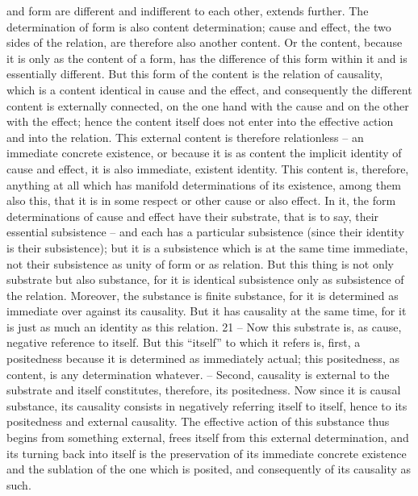 and form are different and indifferent to each other, extends further. The
determination of form is also content determination; cause and effect, the
two sides of the relation, are therefore also another content. Or the content,
because it is only as the content of a form, has the difference of this form
within it and is essentially different. But this form of the content is the
relation of causality, which is a content identical in cause and the effect,
and consequently the different content is externally connected, on the one
hand with the cause and on the other with the effect; hence the content itself
does not enter into the effective action and into the relation.
This external content is therefore relationless – an immediate concrete
existence, or because it is as content the implicit identity of cause and effect,
it is also immediate, existent identity. This content is, therefore, anything
at all which has manifold determinations of its existence, among them also
this, that it is in some respect or other cause or also effect. In it, the form
determinations of cause and effect have their substrate, that is to say, their
essential subsistence – and each has a particular subsistence (since their
identity is their subsistence); but it is a subsistence which is at the same
time immediate, not their subsistence as unity of form or as relation.
But this thing is not only substrate but also substance, for it is identical
subsistence only as subsistence of the relation. Moreover, the substance is
finite substance, for it is determined as immediate over against its causality.
But it has causality at the same time, for it is just as much an identity as this
relation. 21 – Now this substrate is, as cause, negative reference to itself. But
this “itself” to which it refers is, first, a positedness because it is determined
as immediately actual; this positedness, as content, is any determination
whatever. – Second, causality is external to the substrate and itself constitutes,
therefore, its positedness. Now since it is causal substance, its causality consists
in negatively referring itself to itself, hence to its positedness and external
causality. The effective action of this substance thus begins from something
external, frees itself from this external determination, and its turning back
into itself is the preservation of its immediate concrete existence and the
sublation of the one which is posited, and consequently of its causality as
such.

